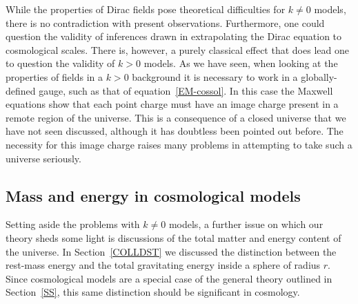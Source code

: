 \documentclass[a4paper]{article}
\numberwithin{equation}{section}
\begin{document}
While the properties of Dirac fields pose theoretical difficulties for
$k\neq 0$ models, there is no contradiction with present observations.
Furthermore, one could question the validity of inferences drawn in
extrapolating the Dirac equation to cosmological scales.  There is,
however, a purely classical effect that does lead one to question the
validity of $k>0$ models.  As we have seen, when looking at the
properties of fields in a $k>0$ background it is necessary to work in
a globally-defined gauge, such as that of equation~\eqref{EM-cossol}.  In
this case the Maxwell equations show that each point charge must have
an image charge present in a remote region of the universe.  This is a
consequence of a closed universe that we have not seen discussed,
although it has doubtless been pointed out before.  The necessity for
this image charge raises many problems in attempting to take such a
universe seriously.


\subsection{Mass and energy in cosmological models}

Setting aside the problems with $k\neq 0$ models, a further issue on
which our theory sheds some light is discussions of the total matter
and energy content of the universe.  In Section~\ref{COLLDST} we
discussed the distinction between the rest-mass energy and the total
gravitating energy inside a sphere of radius $r$.  Since cosmological
models are a special case of the general theory outlined in
Section~\ref{SS}, this same distinction should be significant in
cosmology.
\end{document}
